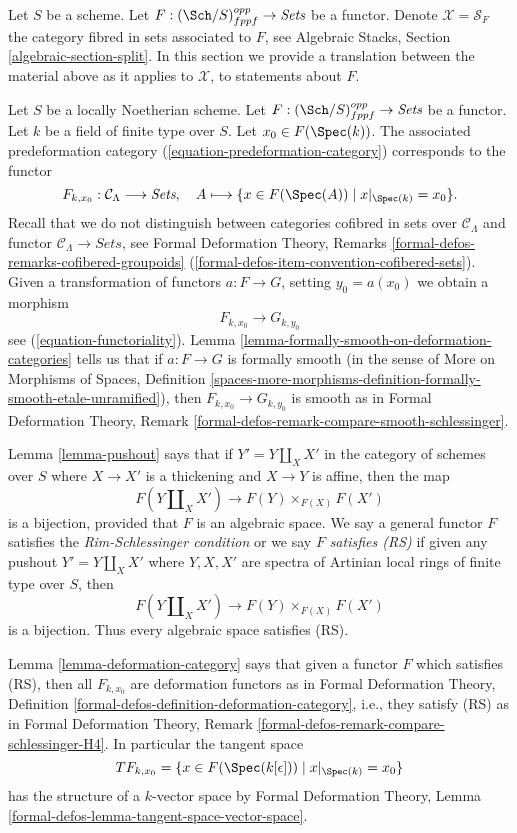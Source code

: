 \noindent
Let $S$ be a scheme. Let $F : (\Sch/S)_{fppf}^{opp} \to \textit{Sets}$ be a
functor. Denote $\mathcal{X} = \mathcal{S}_F$ the category fibred in sets
associated to $F$, see Algebraic Stacks, Section \ref{algebraic-section-split}.
In this section we provide a translation between the material above
as it applies to $\mathcal{X}$, to statements about $F$.

\medskip\noindent
Let $S$ be a locally Noetherian scheme. Let
$F : (\Sch/S)_{fppf}^{opp} \to \textit{Sets}$ be a functor. Let $k$ be
a field of finite type over $S$. Let $x_0 \in F(\Spec(k))$.
The associated predeformation category (\ref{equation-predeformation-category})
corresponds to the functor
$$
F_{k, x_0} : \mathcal{C}_\Lambda \longrightarrow \textit{Sets},
\quad
A \longmapsto \{x \in F(\Spec(A)) \mid x|_{\Spec(k)} = x_0 \}.
$$
Recall that we do not distinguish between
categories cofibred in sets over $\mathcal{C}_\Lambda$
and functor $\mathcal{C}_\Lambda \to \textit{Sets}$,
see Formal Deformation Theory, Remarks
\ref{formal-defos-remarks-cofibered-groupoids}
(\ref{formal-defos-item-convention-cofibered-sets}).
Given a transformation of functors $a : F \to G$, setting
$y_0 = a(x_0)$ we obtain a morphism
$$
F_{k, x_0} \longrightarrow G_{k, y_0}
$$
see (\ref{equation-functoriality}).
Lemma \ref{lemma-formally-smooth-on-deformation-categories} tells us that if
$a : F \to G$ is formally smooth (in the sense of
More on Morphisms of Spaces, Definition
\ref{spaces-more-morphisms-definition-formally-smooth-etale-unramified}), then
$F_{k, x_0} \longrightarrow G_{k, y_0}$ is smooth as
in Formal Deformation Theory, Remark
\ref{formal-defos-remark-compare-smooth-schlessinger}.

\medskip\noindent
Lemma \ref{lemma-pushout} says that if $Y' = Y \amalg_X X'$ in the
category of schemes over $S$ where $X \to X'$ is a thickening and
$X \to Y$ is affine, then the map
$$
F(Y \amalg_X X') \to F(Y) \times_{F(X)} F(X')
$$
is a bijection, provided that $F$ is an algebraic space.
We say a general functor $F$ satisfies the {\it Rim-Schlessinger condition}
or we say $F$ {\it satisfies (RS)} if given any
pushout $Y' = Y \amalg_X X'$ where $Y, X, X'$ are spectra of Artinian
local rings of finite type over $S$, then
$$
F(Y \amalg_X X') \to F(Y) \times_{F(X)} F(X')
$$
is a bijection. Thus every algebraic space satisfies (RS).

\medskip\noindent
Lemma \ref{lemma-deformation-category} says that
given a functor $F$ which satisfies (RS), then all $F_{k, x_0}$
are deformation functors as in
Formal Deformation Theory, Definition
\ref{formal-defos-definition-deformation-category}, i.e., they satisfy
(RS) as in
Formal Deformation Theory, Remark
\ref{formal-defos-remark-compare-schlessinger-H4}.
In particular the tangent space
$$
TF_{k, x_0} = \{x \in F(\Spec(k[\epsilon])) \mid x|_{\Spec(k)} = x_0\}
$$
has the structure of a $k$-vector space by Formal Deformation Theory,
Lemma \ref{formal-defos-lemma-tangent-space-vector-space}.

